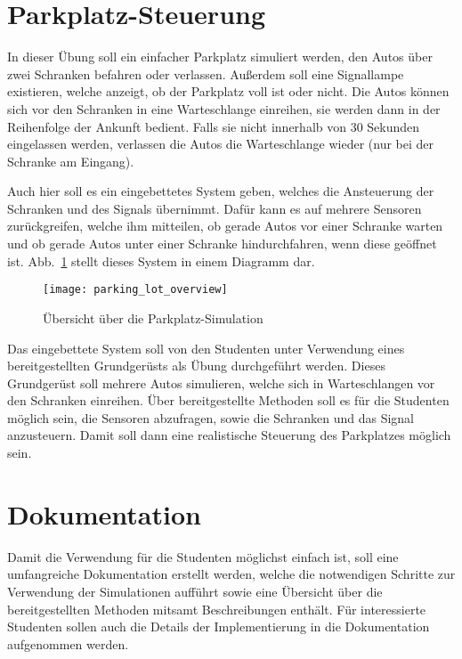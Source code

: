 \documentclass[oneside]{elaboration}
\begin{document}
\section{Parkplatz-Steuerung}
\label{sec:parkplatz-steuerung}

In dieser Übung soll ein einfacher Parkplatz simuliert werden, den Autos
über zwei Schranken befahren oder verlassen. Außerdem soll eine Signallampe
existieren, welche anzeigt, ob der Parkplatz voll ist oder nicht. Die Autos
können sich vor den Schranken in eine Warteschlange einreihen, sie werden dann
in der Reihenfolge der Ankunft bedient. Falls sie nicht innerhalb von 30
Sekunden eingelassen werden, verlassen die Autos die Warteschlange wieder (nur
bei der Schranke am Eingang).

Auch hier soll es ein eingebettetes System geben, welches die Ansteuerung der
Schranken und des Signals übernimmt. Dafür kann es auf mehrere Sensoren
zurückgreifen, welche ihm mitteilen, ob gerade Autos vor einer Schranke warten
und ob gerade Autos unter einer Schranke hindurchfahren, wenn diese geöffnet
ist. Abb.~\ref{fig:parking_lot_overview} stellt dieses System in einem Diagramm
dar.

\begin{figure}[hbt]
\centering
\texttt{[image: parking\_lot\_overview]}
\caption{Übersicht über die Parkplatz-Simulation}
\label{fig:parking_lot_overview}
\end{figure}

Das eingebettete System soll von den Studenten unter Verwendung eines
bereitgestellten Grundgerüsts als Übung durchgeführt werden. Dieses Grundgerüst
soll mehrere Autos simulieren, welche sich in Warteschlangen vor den Schranken
einreihen. Über bereitgestellte Methoden soll es für die Studenten möglich sein,
die Sensoren abzufragen, sowie die Schranken und das Signal anzusteuern. Damit
soll dann eine realistische Steuerung des Parkplatzes möglich sein.

\section{Dokumentation}
\label{sec:dokumentation}

Damit die Verwendung für die Studenten möglichst einfach ist, soll eine
umfangreiche Dokumentation erstellt werden, welche die notwendigen Schritte zur
Verwendung der Simulationen aufführt sowie eine Übersicht über die
bereitgestellten Methoden mitsamt Beschreibungen enthält. Für interessierte
Studenten sollen auch die Details der Implementierung in die Dokumentation
aufgenommen werden.
\end{document}
